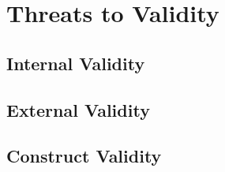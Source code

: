 \section{Threats to Validity}
\label{sec:threats}

\subsection{Internal Validity}
\label{subsec:internal}


\subsection{External Validity}
\label{subsec:external}


\subsection{Construct Validity}
\label{subsec:construct}

